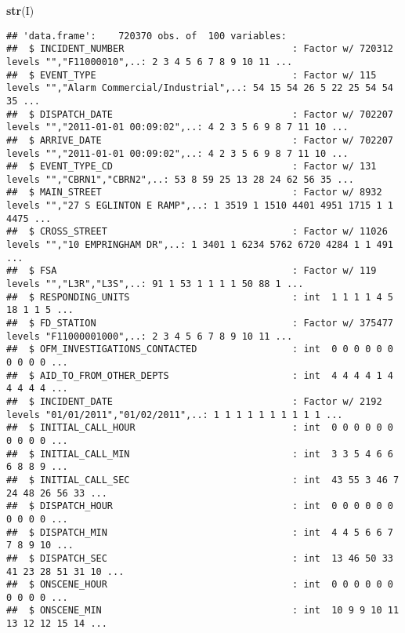 \documentclass[]{article}
\newenvironment{Shaded}{\begin{snugshade}}{\end{snugshade}}
\newcommand{\KeywordTok}[1]{\textcolor[rgb]{0.13,0.29,0.53}{\textbf{#1}}}
\newcommand{\NormalTok}[1]{#1}
\begin{document}
\begin{Shaded}
\begin{Highlighting}[]
\KeywordTok{str}\NormalTok{(I)}
\end{Highlighting}
\end{Shaded}

\begin{verbatim}
## 'data.frame':    720370 obs. of  100 variables:
##  $ INCIDENT_NUMBER                              : Factor w/ 720312 levels "","F11000010",..: 2 3 4 5 6 7 8 9 10 11 ...
##  $ EVENT_TYPE                                   : Factor w/ 115 levels "","Alarm Commercial/Industrial",..: 54 15 54 26 5 22 25 54 54 35 ...
##  $ DISPATCH_DATE                                : Factor w/ 702207 levels "","2011-01-01 00:09:02",..: 4 2 3 5 6 9 8 7 11 10 ...
##  $ ARRIVE_DATE                                  : Factor w/ 702207 levels "","2011-01-01 00:09:02",..: 4 2 3 5 6 9 8 7 11 10 ...
##  $ EVENT_TYPE_CD                                : Factor w/ 131 levels "","CBRN1","CBRN2",..: 53 8 59 25 13 28 24 62 56 35 ...
##  $ MAIN_STREET                                  : Factor w/ 8932 levels "","27 S EGLINTON E RAMP",..: 1 3519 1 1510 4401 4951 1715 1 1 4475 ...
##  $ CROSS_STREET                                 : Factor w/ 11026 levels "","10 EMPRINGHAM DR",..: 1 3401 1 6234 5762 6720 4284 1 1 491 ...
##  $ FSA                                          : Factor w/ 119 levels "","L3R","L3S",..: 91 1 53 1 1 1 1 50 88 1 ...
##  $ RESPONDING_UNITS                             : int  1 1 1 1 4 5 18 1 1 5 ...
##  $ FD_STATION                                   : Factor w/ 375477 levels "F11000001000",..: 2 3 4 5 6 7 8 9 10 11 ...
##  $ OFM_INVESTIGATIONS_CONTACTED                 : int  0 0 0 0 0 0 0 0 0 0 ...
##  $ AID_TO_FROM_OTHER_DEPTS                      : int  4 4 4 4 1 4 4 4 4 4 ...
##  $ INCIDENT_DATE                                : Factor w/ 2192 levels "01/01/2011","01/02/2011",..: 1 1 1 1 1 1 1 1 1 1 ...
##  $ INITIAL_CALL_HOUR                            : int  0 0 0 0 0 0 0 0 0 0 ...
##  $ INITIAL_CALL_MIN                             : int  3 3 5 4 6 6 6 8 8 9 ...
##  $ INITIAL_CALL_SEC                             : int  43 55 3 46 7 24 48 26 56 33 ...
##  $ DISPATCH_HOUR                                : int  0 0 0 0 0 0 0 0 0 0 ...
##  $ DISPATCH_MIN                                 : int  4 4 5 6 6 7 7 8 9 10 ...
##  $ DISPATCH_SEC                                 : int  13 46 50 33 41 23 28 51 31 10 ...
##  $ ONSCENE_HOUR                                 : int  0 0 0 0 0 0 0 0 0 0 ...
##  $ ONSCENE_MIN                                  : int  10 9 9 10 11 13 12 12 15 14 ...

\end{verbatim}
\end{document}

